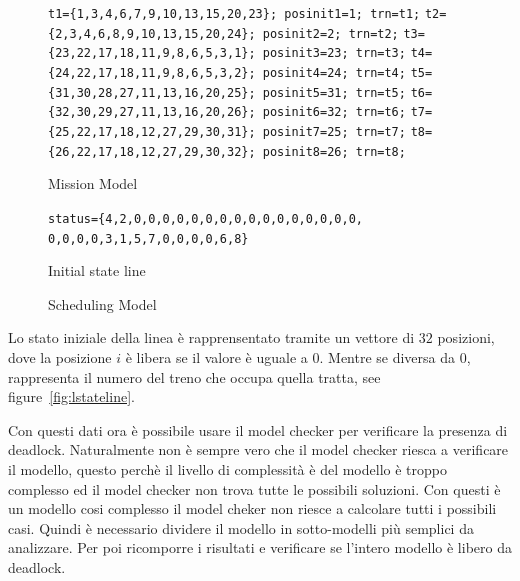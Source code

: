\documentclass{ewic}
\makeatletter
\newenvironment{SubFloat}[2][]%
			{\def\sf@one{#1}%
			\def\sf@two{#2}%
			\setbox\sf@box\hbox
			\bgroup}%
			{ \egroup
			\ifx\@empty\sf@two\@empty\relax
			\def\sf@two{\@empty}
			\fi
			\ifx\@empty\sf@one\@empty\relax
			\subfloat[\sf@two]{\box\sf@box}%
			\else
			\subfloat[\sf@one][\sf@two]{\box\sf@box}%
			\fi}
\makeatother
\begin{document}
			
			\begin{figure}[!htp]
			 \centering
			  \begin{SubFloat}{\label{fig:lmissionm}Mission Model}
			\begin{footnotesize}
			  \begin{minipage}{2.9in} 
			\centering
			\verb+t1={1,3,4,6,7,9,10,13,15,20,23}; posinit1=1; trn=t1;+
			\verb+t2={2,3,4,6,8,9,10,13,15,20,24}; posinit2=2; trn=t2;+
			\verb+t3={23,22,17,18,11,9,8,6,5,3,1}; posinit3=23; trn=t3;+
			\verb+t4={24,22,17,18,11,9,8,6,5,3,2}; posinit4=24; trn=t4;+
			\verb+t5={31,30,28,27,11,13,16,20,25}; posinit5=31; trn=t5;+
			\verb+t6={32,30,29,27,11,13,16,20,26}; posinit6=32; trn=t6;+
			\verb+t7={25,22,17,18,12,27,29,30,31}; posinit7=25; trn=t7;+
			\verb+t8={26,22,17,18,12,27,29,30,32}; posinit8=26; trn=t8;+
			\end{minipage}%
			  \end{footnotesize}  
			\end{SubFloat}
			 \begin{SubFloat}{Initial state line\label{fig:lstateline}}
			 \begin{footnotesize}
			   \begin{minipage}{2.9in}\centering
			\verb+status={4,2,0,0,0,0,0,0,0,0,0,0,0,0,0,0,0,0,+
			\verb+0,0,0,0,3,1,5,7,0,0,0,0,6,8}+
			\end{minipage}%
			\end{footnotesize}
			\end{SubFloat}
			
			\caption{Scheduling Model}
			 \label{fig:SchedulingModel}
			 \end{figure}
			
			
			Lo stato iniziale della linea è rapprensentato tramite un vettore di $32$ posizioni, dove la posizione $i$ è libera se il valore è uguale a $0$. Mentre se diversa da $0$, rappresenta il numero del treno che occupa quella tratta, see figure~\ref{fig:lstateline}.
	
Con questi dati ora è possibile usare il model checker per verificare la presenza di deadlock.
Naturalmente non è sempre vero che il model checker riesca a verificare il modello, questo perchè il livello di complessità  è del modello è troppo complesso ed il model checker non trova tutte le possibili soluzioni.
Con questi è un modello cosi complesso il model cheker non riesce a calcolare tutti i possibili casi. Quindi è necessario dividere il modello in sotto-modelli più semplici da analizzare.
Per poi ricomporre i risultati e verificare se l'intero modello è libero da deadlock.
\end{document}
